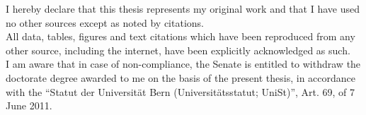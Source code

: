 \documentclass[
10pt, %
english, %
singlespacing, %
headsepline, %
]{MastersDoctoralThesis} %
\begin{document}
\begin{declaration}
\addchaptertocentry{\authorshipname} %

\vspace{1cm}

 \vspace{0.5cm}

 \vspace{2cm}

{\noindent I  hereby  declare  that  this  thesis represents my  original  work and  that  I  have  used  no  other sources except as noted by citations.\\
All  data,  tables,  figures  and  text  citations  which  have  been  reproduced  from  any  other source, including the internet, have been explicitly acknowledged as such.\\
I am aware that in case of non-compliance, the Senate is entitled to withdraw the doctorate degree awarded to me on the basis of the present thesis, in accordance with the “Statut der Universität Bern (Universitätsstatut; UniSt)”, Art. 69, of 7 June 2011.\par} \vspace{1cm}
 
 
 \vspace{1cm}
\end{declaration}
\end{document}
